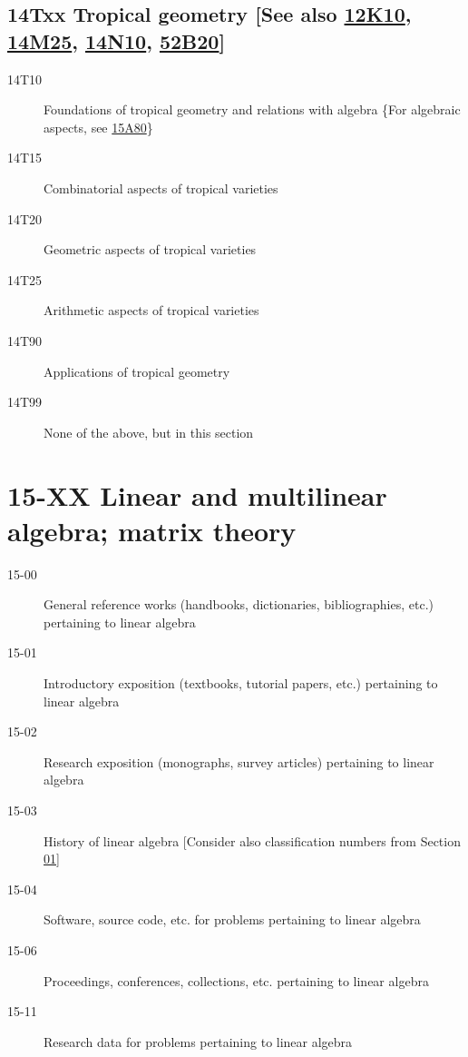 \subsection*{14Txx Tropical geometry [See also \hyperref[12K10]{12K10}, \hyperref[14M25]{14M25}, \hyperref[14N10]{14N10}, \hyperref[52B20]{52B20}] }\label{14Txx}
\begin{description}     
\item [14T10]\label{14T10} Foundations of tropical geometry and relations with algebra \{For algebraic aspects, see \hyperref[15A80]{15A80}\}
\item [14T15]\label{14T15} Combinatorial aspects of tropical varieties
\item [14T20]\label{14T20} Geometric aspects of tropical varieties
\item [14T25]\label{14T25} Arithmetic aspects of tropical varieties
\item [14T90]\label{14T90} Applications of tropical geometry
\item [14T99]\label{14T99} None of the above, but in this section
\end{description}          
\section*{15-XX Linear and multilinear algebra; matrix theory }\label{15-XX}
\begin{description}
\item [15-00]\label{15-00} General reference works (handbooks, dictionaries, bibliographies, etc.) pertaining to linear algebra
\item [15-01]\label{15-01} Introductory exposition (textbooks, tutorial papers, etc.) pertaining to linear algebra
\item [15-02]\label{15-02} Research exposition (monographs, survey articles) pertaining to linear algebra
\item [15-03]\label{15-03} History of linear algebra [Consider also classification numbers from Section \hyperref[01-XX]{01}]
\item [15-04]\label{15-04} Software, source code, etc. for problems pertaining to linear algebra
\item [15-06]\label{15-06} Proceedings, conferences, collections, etc. pertaining to linear algebra
\item [15-11]\label{15-11} Research data for problems pertaining to linear algebra
\end{description}

